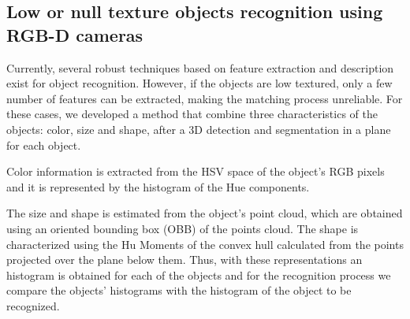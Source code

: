 \documentclass{llncs}
\begin{document}


\subsection{Low or null texture objects recognition using RGB-D cameras}\label{subsec:objDet}

Currently, several robust techniques based on feature extraction and description exist for object recognition. However, if the objects 
are low textured, only a few number of features can be extracted, making the matching process unreliable. For these cases, 
we developed a method that combine three characteristics of the objects: color, size and shape, 
after a 3D detection and segmentation in a plane for each object.

Color information is extracted from the HSV space of the object's RGB pixels and it is represented by the histogram of the Hue 
components.

The size and shape is estimated from the object's point cloud, which are obtained using an oriented bounding box (OBB) of the points
cloud.
The shape is characterized using the Hu Moments \cite{hu1962_moments} of the convex hull calculated from the points projected over the
plane below them. 
Thus, with these representations an histogram is obtained for each of the objects and  
for the recognition process we compare the objects' histograms with the histogram of the object to be recognized.

\end{document}
